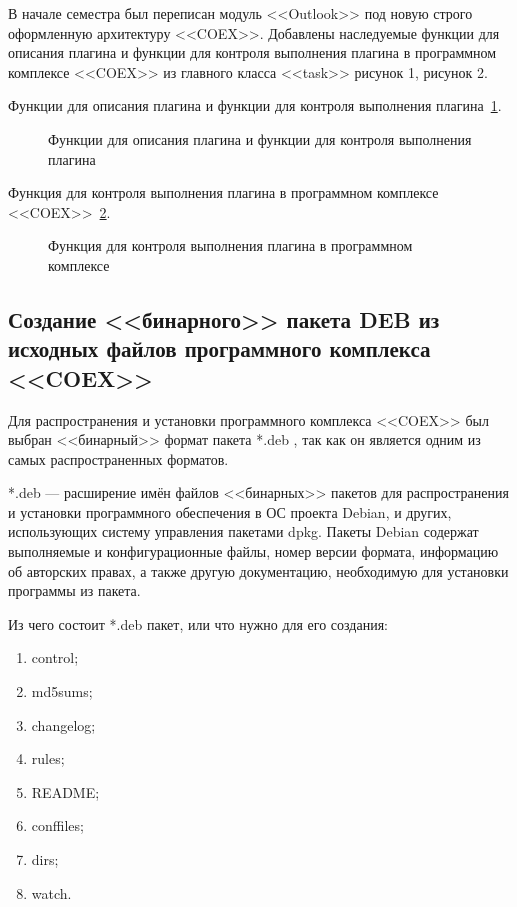 В начале семестра был переписан модуль <<Outlook>> под новую строго оформленную архитектуру <<COEX>>.
Добавлены наследуемые функции для описания плагина и функции для контроля выполнения плагина в программном комплексе <<COEX>> из главного класса <<task>> рисунок 1, рисунок 2.

Функции для описания плагина и функции для контроля выполнения плагина~\ref{Outlook:Outlook}.

\begin{figure}[h!]
\caption{ Функции для описания плагина и функции для контроля выполнения плагина }
\label{Outlook:Outlook}
\end{figure}

Функция для контроля выполнения плагина в программном комплексе <<COEX>>~\ref{Outlook2:Outlook2}.

\begin{figure}[h!]
\caption{ Функция для контроля выполнения плагина в программном комплексе }
\label{Outlook2:Outlook2}
\end{figure}

\subsection {Создание <<бинарного>> пакета DEB из исходных файлов программного комплекса <<COEX>>}

Для распространения и установки программного комплекса <<COEX>> был выбран <<бинарный>> формат пакета *.deb , так как он является одним из самых распространенных форматов. 

*.deb --- расширение имён файлов <<бинарных>> пакетов для распространения и установки программного обеспечения в ОС проекта Debian, и других, использующих систему управления пакетами dpkg. Пакеты Debian содержат выполняемые и конфигурационные файлы, номер версии формата, информацию об авторских правах, а также другую документацию, необходимую для установки программы из пакета.

Из чего состоит *.deb пакет, или что нужно для его создания:

\begin{enumerate}
\item control;
\item md5sums;
\item changelog;
\item rules;
\item README;
\item conffiles;
\item dirs;
\item watch.
\end{enumerate}

